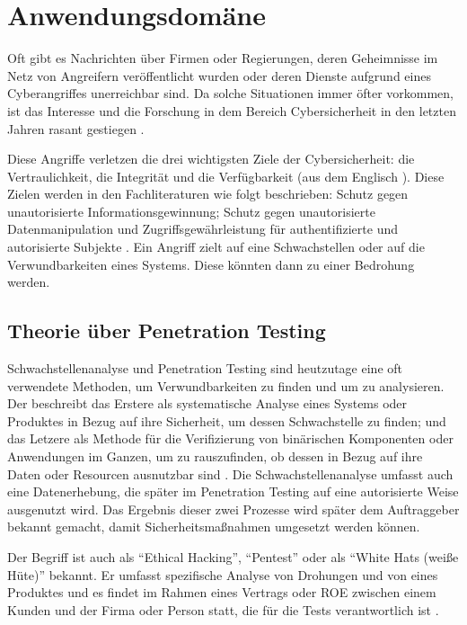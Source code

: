 \section{Anwendungsdomäne}

Oft gibt es Nachrichten über Firmen oder Regierungen, deren Geheimnisse im Netz von Angreifern veröffentlicht wurden oder deren Dienste aufgrund eines \gls{Cyberangriff}es unerreichbar sind. Da solche Situationen immer öfter vorkommen, ist das Interesse und die Forschung in dem Bereich \gls{Cybersicherheit} in den letzten Jahren rasant gestiegen \citep{Tanembaum_MBS}. 

Diese Angriffe verletzen die drei wichtigsten Ziele der \gls{Cybersicherheit}: die Vertraulichkeit, die Integrität und die Verfügbarkeit (aus dem Englisch ). Diese Zielen werden in den Fachliteraturen wie folgt beschrieben: Schutz gegen unautorisierte Informationsgewinnung; Schutz gegen unautorisierte Datenmanipulation und Zugriffsgewährleistung für authentifizierte und autorisierte Subjekte \citep{Wendzel_It-Sicherheit}. Ein Angriff zielt auf eine \gls{Schwachstelle}n oder auf die \gls{Verwundbarkeit}en eines Systems. Diese könnten dann zu einer Bedrohung werden.

\subsection{Theorie über Penetration Testing}

Schwachstellenanalyse und Penetration Testing sind heutzutage eine oft verwendete Methoden, um \gls{Verwundbarkeit}en zu finden und um zu analysieren. Der  beschreibt das Erstere als systematische Analyse eines Systems oder Produktes in Bezug auf ihre Sicherheit, um dessen \gls{Schwachstelle} zu finden; und das Letzere als Methode für die Verifizierung von binärischen Komponenten oder Anwendungen im Ganzen, um zu rauszufinden, ob dessen  in Bezug auf ihre Daten oder Resourcen ausnutzbar sind \citep{NIST_Definitionen}. Die Schwachstellenanalyse umfasst auch eine Datenerhebung, die später im Penetration Testing auf eine autorisierte Weise ausgenutzt wird\citep{Goel_VulAsses_PenTest}. Das Ergebnis dieser zwei Prozesse wird später dem Auftraggeber bekannt gemacht, damit Sicherheitsmaßnahmen umgesetzt werden können.

Der Begriff ist auch als ``Ethical Hacking'', ``Pentest'' oder als ``White Hats (weiße Hüte)'' bekannt. Er umfasst spezifische Analyse von Drohungen und von  eines Produktes und es findet im Rahmen eines Vertrags oder \gls{ROE} zwischen einem Kunden und der Firma oder Person statt, die für die Tests verantwortlich ist \citep{Bishop_PenTest}.

